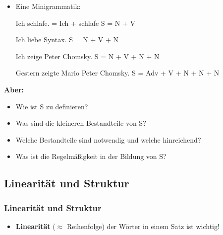 \begin{frame}

\begin{itemize}
	\item Eine Minigrammatik:

	\eal 
	\ex Ich schlafe. = Ich + schlafe
\pause	
	\ex	S = N + V 
	\zl

\pause
	
	\eal 
	\ex Ich liebe Syntax.
\pause
	\ex S = N + V + N
	\zl

\pause
		
	\eal 
	\ex Ich zeige Peter Chomsky.
\pause
	\ex S = N + V + N + N 
	\zl
	
\pause
	
	\eal 
	\ex Gestern zeigte Mario Peter Chomsky.
\pause
	\ex S = Adv + V + N + N + N 
	\zl

\end{itemize}

\end{frame}


\begin{frame}

\textbf{Aber: }
	\begin{itemize}
		\item Wie ist S zu definieren?
		\item Was sind die kleineren Bestandteile von S?
		\item Welche Bestandteile sind notwendig und welche hinreichend?
		\item Was ist die Regelmäßigkeit in der Bildung von S?
	\end{itemize}	 	

\end{frame}

\subsection{Linearität und Struktur}


\begin{frame}
\frametitle{Linearität und Struktur}

\begin{itemize}
	\item \textbf{Linearität} ($\approx$ Reihenfolge) der Wörter in einem Satz ist wichtig!
	
	\z
	
	\z

\end{itemize}

\end{frame}

